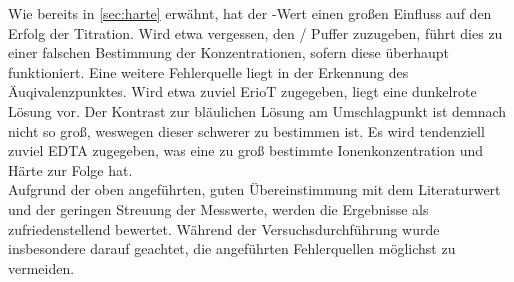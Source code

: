 \documentclass{article}
\begin{document}
        Wie bereits in \ref{sec:harte} erwähnt, hat der \pH-Wert einen großen Einfluss auf den Erfolg der Titration. Wird etwa vergessen, den / Puffer zuzugeben, führt dies zu einer falschen Bestimmung der Konzentrationen, sofern diese überhaupt funktioniert. Eine weitere Fehlerquelle liegt in der Erkennung des Äuqivalenzpunktes. Wird etwa zuviel ErioT zugegeben, liegt eine dunkelrote Lösung vor. Der Kontrast zur bläulichen Lösung am Umschlagpunkt ist demnach nicht so groß, weswegen dieser schwerer zu bestimmen ist. Es wird tendenziell zuviel EDTA zugegeben, was eine zu groß bestimmte Ionenkonzentration und Härte zur Folge hat. \\
        
       Aufgrund der oben angeführten, guten Übereinstimmung mit dem Literaturwert und der geringen Streuung der Messwerte, werden die Ergebnisse als zufriedenstellend bewertet. Während der Versuchsdurchführung wurde insbesondere darauf geachtet, die angeführten Fehlerquellen möglichst zu vermeiden.
       
  \pagebreak
  
  \listofreactions
  \printbibliography[title=Literaturverzeichnis]
  \listoftables
  
\end{document}
